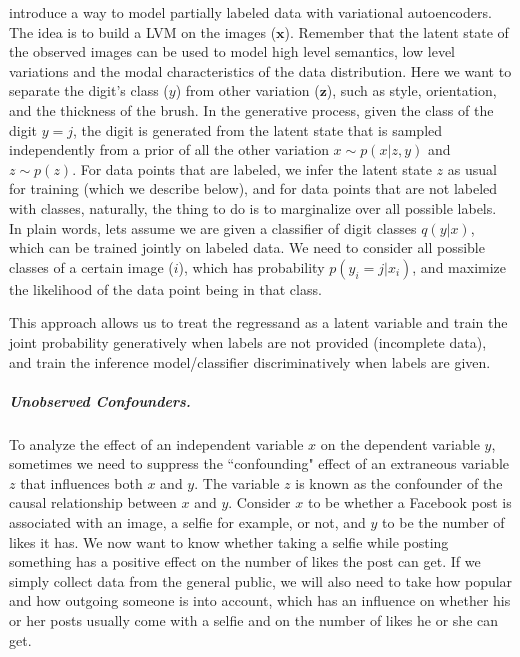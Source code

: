 \documentclass{article}
\newcommand{\x}{\mathbf{x}}
\newcommand{\z}{\mathbf{z}}
\begin{document}
\citet{kingma2014semi, maaloe2016auxiliary} introduce a way to model partially labeled data with variational autoencoders. 
The idea is to build a LVM on the images ($\x$). 
Remember that the latent state of the observed images can be used to model high level semantics, low level variations and the modal characteristics of the data distribution. 
Here we want to separate the digit's class ($y$) from other variation ($\z$), such as style, orientation, and the thickness of the brush. 
In the generative process, given the class of the digit $y=j$, the digit is generated from the latent state that is sampled independently from a prior of all the other variation $x\sim p(x|z,y)$ and $z\sim p(z)$.
For data points that are labeled, we infer the latent state $z$ as usual for training (which we describe below), and for data points that are not labeled with classes, naturally, the thing to do is to marginalize over all possible labels. 
In plain words, lets assume we are given a classifier of digit classes $q(y|x)$, which can be trained jointly on labeled data. 
We need to consider all possible classes of a certain image ($i$), which has probability $p(y_i=j|x_i)$, and maximize the likelihood of the data point being in that class.

This approach allows us to treat the regressand as a latent variable and train the joint probability generatively when labels are not provided (incomplete data), and train the inference model/classifier discriminatively when labels are given. 





\subparagraph{Unobserved Confounders.}
To analyze the effect of an independent variable $x$ on the dependent variable $y$, sometimes we need to suppress the ``confounding" effect of an extraneous variable $z$ that influences both $x$ and $y$. 
The variable $z$ is known as the confounder of the causal relationship between $x$ and $y$. 
Consider $x$ to be whether a Facebook post is associated with an image, a selfie for example, or not, and $y$ to be the number of likes it has. 
We now want to know whether taking a selfie while posting something has a positive effect on the number of likes the post can get. 
If we simply collect data from the general public, we will also need to take how popular and how outgoing someone is into account, which has an influence on whether his or her posts usually come with a selfie and on the number of likes he or she can get. 
\end{document}
